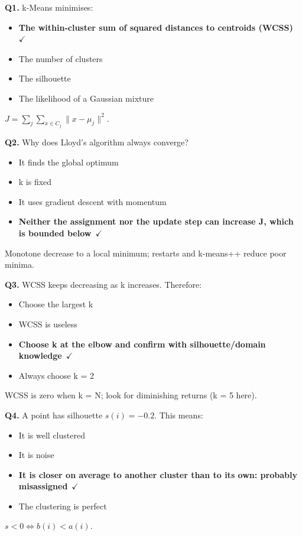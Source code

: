 \documentclass[11pt]{article}
\begin{document}
{\small

\noindent\textbf{Q1.} k-Means minimises:\begin{itemize}[leftmargin=2.2em,itemsep=0pt,topsep=1pt]\item[\textbf{A.}] \textbf{The within-cluster sum of squared distances to centroids (WCSS)}~{\color{GrnN}$\checkmark$}\item[B.] The number of clusters\item[C.] The silhouette\item[D.] The likelihood of a Gaussian mixture\end{itemize} $J=\sum_j\sum_{x\in C_j}\|x-\mu_j\|^2$.\par\medskip

\noindent\textbf{Q2.} Why does Lloyd's algorithm always converge?\begin{itemize}[leftmargin=2.2em,itemsep=0pt,topsep=1pt]\item[A.] It finds the global optimum\item[B.] k is fixed\item[C.] It uses gradient descent with momentum\item[\textbf{D.}] \textbf{Neither the assignment nor the update step can increase J, which is bounded below}~{\color{GrnN}$\checkmark$}\end{itemize} Monotone decrease to a local minimum; restarts and k-means++ reduce poor minima.\par\medskip

\noindent\textbf{Q3.} WCSS keeps decreasing as k increases. Therefore:\begin{itemize}[leftmargin=2.2em,itemsep=0pt,topsep=1pt]\item[A.] Choose the largest k\item[B.] WCSS is useless\item[\textbf{C.}] \textbf{Choose k at the elbow and confirm with silhouette/domain knowledge}~{\color{GrnN}$\checkmark$}\item[D.] Always choose k = 2\end{itemize} WCSS is zero when k = N; look for diminishing returns (k = 5 here).\par\medskip

\noindent\textbf{Q4.} A point has silhouette $s(i)=-0.2$. This means:\begin{itemize}[leftmargin=2.2em,itemsep=0pt,topsep=1pt]\item[A.] It is well clustered\item[B.] It is noise\item[\textbf{C.}] \textbf{It is closer on average to another cluster than to its own: probably misassigned}~{\color{GrnN}$\checkmark$}\item[D.] The clustering is perfect\end{itemize} $s<0\iff b(i)<a(i)$.\par\medskip

}
\end{document}
